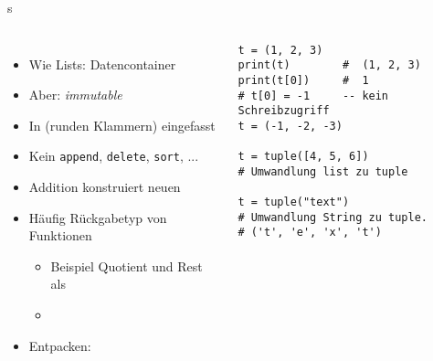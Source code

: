 
\begin{frame}[fragile]{s}
%
\begin{columns}[T]
\begin{itemize}
\item Wie Lists: Datencontainer
\item Aber: \emph{immutable}
\item In (runden Klammern) eingefasst
\item Kein \texttt{append}, \texttt{delete}, \texttt{sort}, ...
\item Addition konstruiert neuen 
\item Häufig Rückgabetyp von Funktionen
	\begin{itemize}
	\item Beispiel  Quotient und Rest als 
	\item {} \thus ~ 
	\end{itemize}
\item Entpacken: 
\end{itemize}
%
\begin{codebox}
\begin{verbatim}
t = (1, 2, 3)
print(t)        #  (1, 2, 3)
print(t[0])     #  1
# t[0] = -1     -- kein Schreibzugriff
t = (-1, -2, -3)

t = tuple([4, 5, 6])
# Umwandlung list zu tuple

t = tuple("text")
# Umwandlung String zu tuple.
# ('t', 'e', 'x', 't')
\end{verbatim}
\end{codebox}
\end{columns}
%
\end{frame}


